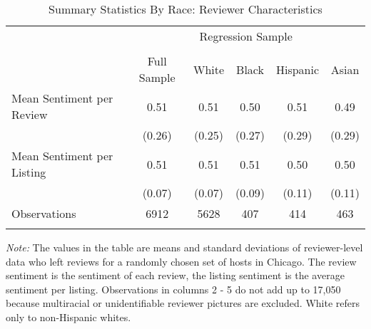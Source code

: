 \begin{table}[htbp]
\caption{Summary Statistics By Race: Reviewer Characteristics}
\begin{center}%
\small\begin{tabular}{l c c c c c}
& \multicolumn{5}{c}{Regression Sample}
\\
 \cmidrule(r){2-6}
\\
 & \multicolumn{1}{c}{Full Sample} & White & Black & Hispanic & Asian
\\
\hline\hline\noalign{\smallskip} 
 Mean Sentiment per Review & 0.51 & 0.51 & 0.50 & 0.51 & 0.49 \\
 & (0.26) & (0.25) & (0.27) & (0.29) & (0.29) \\
 Mean Sentiment per Listing & 0.51 & 0.51 & 0.51 & 0.50 & 0.50 \\
 & (0.07) & (0.07) & (0.09) & (0.11) & (0.11) \\
\hline
Observations & 6912 & 5628 & 407 & 414 & 463
\\
\hline\hline\noalign{\smallskip} \end{tabular} 
\begin{minipage}{6in}
{\it Note:} The values in the table are means and standard deviations of reviewer-level data who left reviews for a randomly chosen set of hosts in Chicago. The review sentiment is the sentiment of each review, the listing sentiment is the average sentiment per listing. Observations in columns 2 - 5 do not add up to 17,050 because multiracial or unidentifiable reviewer pictures are excluded. White refers only to non-Hispanic whites.
\end{minipage}
\end{center}
\end{table}
